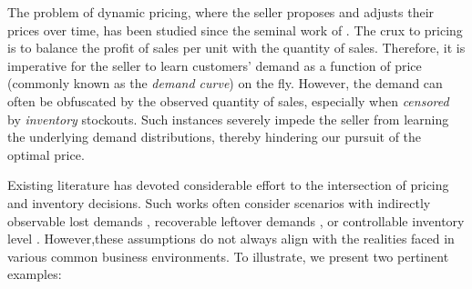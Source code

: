 The problem of dynamic pricing, where the seller proposes and adjusts their prices over time, has been studied since the seminal work of \citet{cournot1897researches}. The crux to pricing is to balance the profit of sales per unit with the quantity of sales. Therefore, it is imperative for the seller to learn customers' demand as a function of price (commonly known as the \emph{demand curve}) on the fly. However, the demand can often be obfuscated by the observed quantity of sales, especially when \emph{censored} by \emph{inventory} stockouts. Such instances severely impede the seller from learning the underlying demand distributions, thereby hindering our pursuit of the optimal price.

Existing literature has devoted considerable effort to the intersection of pricing and inventory decisions. Such works often consider scenarios with indirectly observable lost demands \citep{keskin2022data}, recoverable leftover demands \citet{chen2019coordinating}, or controllable inventory level \citep{chen2023optimal}. However,these assumptions do not always align with the realities faced in various common business environments. To illustrate, we present two pertinent examples:
\vspace{1em}

